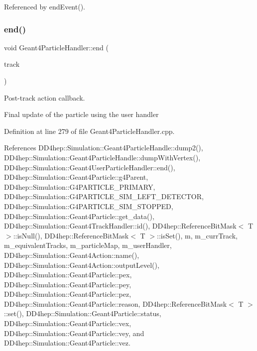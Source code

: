 Referenced by end\+Event().

\hypertarget{class_d_d4hep_1_1_simulation_1_1_geant4_particle_handler_a6983068cd3f90fb922cb89378a85770e}{}\label{class_d_d4hep_1_1_simulation_1_1_geant4_particle_handler_a6983068cd3f90fb922cb89378a85770e} 
\subsubsection{\texorpdfstring{end()}{end()}}
{\footnotesize\ttfamily void Geant4\+Particle\+Handler\+::end (\begin{DoxyParamCaption}\item[{const G4\+Track $\ast$}]{track }\end{DoxyParamCaption})\hspace{0.3cm}{\ttfamily [virtual]}}



Post-\/track action callback. 

Final update of the particle using the user handler 

Definition at line 279 of file Geant4\+Particle\+Handler.\+cpp.



References D\+D4hep\+::\+Simulation\+::\+Geant4\+Particle\+Handle\+::dump2(), D\+D4hep\+::\+Simulation\+::\+Geant4\+Particle\+Handle\+::dump\+With\+Vertex(), D\+D4hep\+::\+Simulation\+::\+Geant4\+User\+Particle\+Handler\+::end(), D\+D4hep\+::\+Simulation\+::\+Geant4\+Particle\+::g4\+Parent, D\+D4hep\+::\+Simulation\+::\+G4\+P\+A\+R\+T\+I\+C\+L\+E\+\_\+\+P\+R\+I\+M\+A\+RY, D\+D4hep\+::\+Simulation\+::\+G4\+P\+A\+R\+T\+I\+C\+L\+E\+\_\+\+S\+I\+M\+\_\+\+L\+E\+F\+T\+\_\+\+D\+E\+T\+E\+C\+T\+OR, D\+D4hep\+::\+Simulation\+::\+G4\+P\+A\+R\+T\+I\+C\+L\+E\+\_\+\+S\+I\+M\+\_\+\+S\+T\+O\+P\+P\+ED, D\+D4hep\+::\+Simulation\+::\+Geant4\+Particle\+::get\+\_\+data(), D\+D4hep\+::\+Simulation\+::\+Geant4\+Track\+Handler\+::id(), D\+D4hep\+::\+Reference\+Bit\+Mask$<$ T $>$\+::is\+Null(), D\+D4hep\+::\+Reference\+Bit\+Mask$<$ T $>$\+::is\+Set(), m, m\+\_\+curr\+Track, m\+\_\+equivalent\+Tracks, m\+\_\+particle\+Map, m\+\_\+user\+Handler, D\+D4hep\+::\+Simulation\+::\+Geant4\+Action\+::name(), D\+D4hep\+::\+Simulation\+::\+Geant4\+Action\+::output\+Level(), D\+D4hep\+::\+Simulation\+::\+Geant4\+Particle\+::pex, D\+D4hep\+::\+Simulation\+::\+Geant4\+Particle\+::pey, D\+D4hep\+::\+Simulation\+::\+Geant4\+Particle\+::pez, D\+D4hep\+::\+Simulation\+::\+Geant4\+Particle\+::reason, D\+D4hep\+::\+Reference\+Bit\+Mask$<$ T $>$\+::set(), D\+D4hep\+::\+Simulation\+::\+Geant4\+Particle\+::status, D\+D4hep\+::\+Simulation\+::\+Geant4\+Particle\+::vex, D\+D4hep\+::\+Simulation\+::\+Geant4\+Particle\+::vey, and D\+D4hep\+::\+Simulation\+::\+Geant4\+Particle\+::vez.



